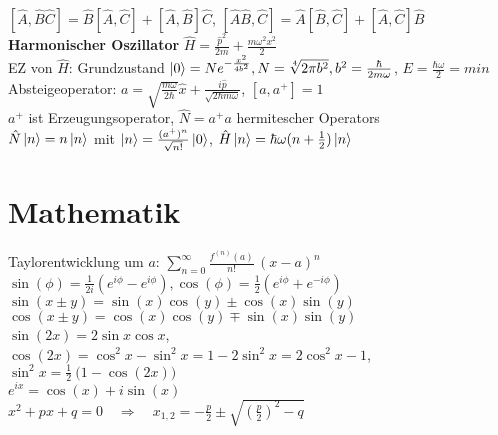 \documentclass[a4paper, 11pt, fleqn]{article}
\begin{document}
\begin{multicols}{2}
$[\hat{A}, \hat{B} \hat{C}] = \hat{B}[\hat{A}, \hat{C}] + [\hat{A}, \hat{B}] \hat{C}$, $[\hat{A} \hat{B}, \hat{C}] = \hat{A} [\hat{B}, \hat{C}] + [\hat{A}, \hat{C}] \hat{B}$\\
\textbf{Harmonischer Oszillator} $\hat{H} = \frac{\hat{p}^2}{2m} + \frac{m \omega^2 x^2}{2}$\\
EZ von $\hat{H}$: Grundzustand $\ket{0} = N e^{-\frac{x^2}{4b^2}}, N = \sqrt[4]{2 \pi b^2}, b^2 = \frac{\hbar}{2 m \omega}$, $E = \frac{\hbar \omega}{2} = min$\\
Absteigeoperator: $a = \sqrt{\frac{m\omega}{2 \hbar}} \hat{x} + \frac{i \hat{p}}{\sqrt{2 \hbar m \omega}}$, $[a, a^+] = 1$\\
$a^+$ ist Erzeugungsoperator, $\hat{N} = a^+ a$ hermitescher Operators\\
$\hat{N} \ket{n} = n \ket{n}$ mit $\ket{n} = \frac{(a^+)^n}{\sqrt{n!}} \ket{0}$, $\hat{H} \ket{n} = \hbar \omega (n + \frac{1}{2}) \ket{n}$

\section{Mathematik}
Taylorentwicklung um $a$: $\sum_{n=0} ^ {\infty} \frac {f^{(n)}(a)}{n!} \, (x-a)^{n}$\\
$\sin(\phi) = \frac1{2i} (e^{i\phi} - e^{i\phi}), \cos(\phi) = \frac12 (e^{i\phi} + e^{-i\phi})$\\
$\sin(x \pm y)=\sin(x)\cos(y) \pm \cos(x)\sin(y)$\\
$\cos(x \pm y)=\cos(x)\cos(y) \mp \sin(x)\sin(y)$\\
$\sin (2x)= 2 \sin x \cos x$, $\cos (2x)= \cos^2 x - \sin^2 x = 1 - 2 \sin^2 x = 2 \cos^2 x - 1$, $\sin^2 x = \frac{1}{2}\ \Big(1 - \cos (2x) \Big)$\\
$e^{ix} = \cos(x) + i \sin(x)$\\
$x^2+px+q=0 \quad \Rightarrow \quad x_{1,2} = - \frac{p}{2}\pm\sqrt{\left(\frac{p}2\right)^2 - q}$
\end{multicols}
\end{document}
